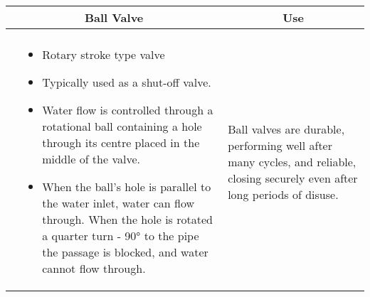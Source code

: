\begin{landscape}
\begin{table}
\begin{tabular}{| m{7cm} m{10cm} | m{7cm} | }
\multicolumn{2}{c}{Ball Valve} & \multicolumn{1}{c}{Use} \\ \hline
    \begin{minipage}{.3\textwidth}
   \vspace{-2em} 
     \texttt{[image: BallValve2]}\\
    \end{minipage}
    &
  \scriptsize{\begin{itemize}[topsep=5pt, partopsep=0pt]
  \item Rotary stroke type valve \item Typically used as a shut-off valve. \item Water flow is controlled through a rotational ball containing a hole through its centre placed in the middle of the valve. \item When the ball’s hole is parallel to the water inlet, water can flow through.  When the hole is rotated a quarter turn - 90\si{\degree} to the pipe the passage is blocked, and water cannot flow through.
    \end{itemize}}  
    &
        \vspace{0.4cm}
      \begin{itemize}[leftmargin=*]
      \scriptsize{
        \item Ball valves are durable, performing well after many cycles, and reliable, closing securely even after long periods of disuse.  }
      \end{itemize}
  

\end{tabular}
\end{table}
\end{landscape}
